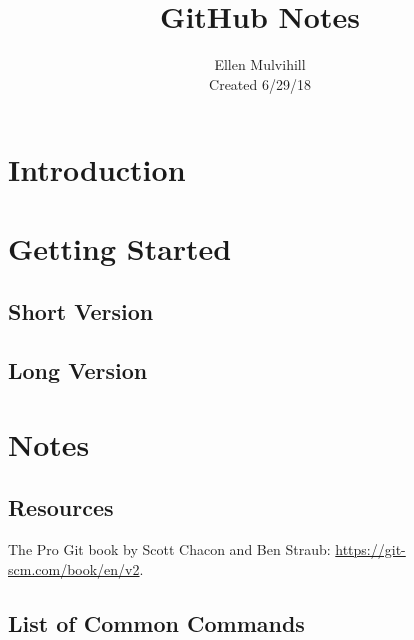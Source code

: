 \documentclass[12pt, letterpaper]{article} 	%
\title{\Huge GitHub Notes}
\author{Ellen Mulvihill \\ Created 6/29/18}
\begin{document}
\maketitle
\tableofcontents
\clearpage

\section{Introduction}

\section{Getting Started}

\subsection{Short Version}

\subsection{Long Version}


\section{Notes}

\subsection{Resources}
The Pro Git book by Scott Chacon and Ben Straub\cite{ProGit}: \url{https://git-scm.com/book/en/v2}.


\subsection{List of Common Commands}

\clearpage

\end{document}
